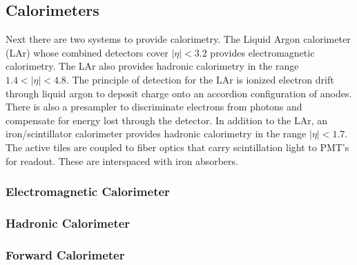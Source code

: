 \subsection{Calorimeters}
Next there are two systems to provide calorimetry.
The Liquid Argon calorimeter (LAr) whose combined detectors cover $|\eta|<3.2$ provides electromagnetic calorimetry.
The LAr also provides hadronic calorimetry in the range $1.4<|\eta|<4.8$.
The principle of detection for the LAr is ionized electron drift through liquid argon to deposit charge onto an accordion configuration of anodes.
There is also a presampler to discriminate electrons from photons and compensate for energy lost through the detector.
In addition to the LAr, an iron/scintillator calorimeter provides hadronic calorimetry in the range $|\eta|<1.7$.
The active tiles are coupled to fiber optics that carry scintillation light to PMT's for readout.
These are interspaced with iron absorbers.
\subsubsection{Electromagnetic Calorimeter}
\subsubsection{Hadronic Calorimeter}
\subsubsection{Forward Calorimeter}

